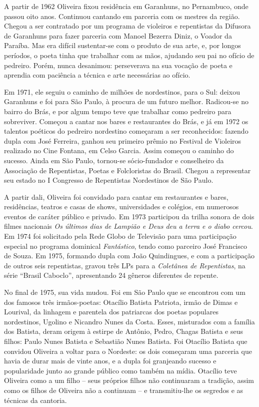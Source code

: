 A partir de 1962 Oliveira fixou residência em
Garanhuns, no Pernambuco, onde passou oito anos.
Continuou cantando em parceria com os mestres da região.
Chegou a ser contratado por um programa de violeiros e
repentistas da Difusora de Garanhuns para fazer parceria
com Manoel Bezerra Diniz, o Voador da Paraíba. Mas era
difícil sustentar-se com o produto de sua arte, e, por longos
períodos, o poeta tinha que trabalhar com as mãos,
ajudando seu pai no ofício de pedreiro. Porém, nunca
desanimou: perseverava na sua vocação de poeta e aprendia
com paciência a técnica e arte necessárias ao ofício.

Em 1971, ele seguiu o caminho de milhões de
nordestinos, para o Sul: deixou Garanhuns e foi para São
Paulo, à procura de um futuro melhor. Radicou-se no bairro
do Brás, e por algum tempo teve que trabalhar como
pedreiro para sobreviver. Começou a cantar nos bares e
restaurantes do Brás, e já em 1972 os talentos poéticos do
pedreiro nordestino começaram a ser reconhecidos: fazendo
dupla com José Ferreira, ganhou seu primeiro prêmio no
Festival de Violeiros realizado no Cine Fontana, em Celso
Garcia. Assim começou o caminho do sucesso. Ainda em
São Paulo, tornou-se sócio-fundador e conselheiro da
Associação de Repentistas, Poetas e Folcloristas do Brasil.
Chegou a representar seu estado no I Congresso de
Repentistas Nordestinos de São Paulo.

A partir dali, Oliveira foi convidado para cantar em
restaurantes e bares, residências, teatros e casas de shows,
universidades e colégios, em numerosos eventos de caráter
público e privado. Em 1973 participou da trilha sonora de
dois filmes nacionais \textit{Os últimos dias de Lampião e Deus
deu a terra e o diabo cercou}. Em 1974 foi solicitado pela
Rede Globo de Televisão para uma participação especial
no programa dominical \textit{Fantástico}, tendo
como parceiro José Francisco de Souza. Em 1975, formando dupla com
João Quindingues, e com a participação de outros seis
repentistas, gravou três LPs para a \textit{Coletânea de
Repentistas}, na série ``Brasil Caboclo'',
apresentando 24 gêneros diferentes de repente.

No final de 1975, sua vida mudou. Foi em São Paulo
que se encontrou com um dos famosos três irmãos-poetas:
Otacílio Batista Patriota, irmão de Dimas e Lourival, da
linhagem e parentela dos patriarcas dos poetas populares
nordestinos, Ugolino e Nicandro Nunes da Costa. Esses,
misturados com a família dos Batista, deram origem à
estirpe de Antônio, Pedro, Chagas Batista e seus filhos:
Paulo Nunes Batista e Sebastião Nunes Batista. Foi Otacílio
Batista que convidou Oliveira a voltar para o Nordeste: os
dois começaram uma parceria que havia de durar mais de
vinte anos, e a dupla foi granjeando sucesso e popularidade
junto ao grande público como também na mídia. Otacílio
teve Oliveira como a um filho -- seus próprios filhos não
continuaram a tradição, assim como os filhos de Oliveira
não a continuam -- e transmitiu-lhe os segredos e as
técnicas da cantoria.

